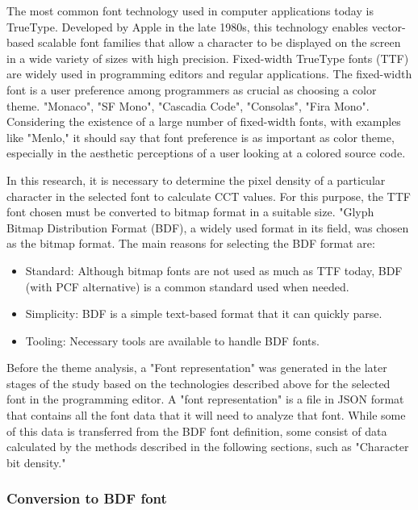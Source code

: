 \documentclass{article}
\begin{document}
The most common font technology used in computer applications today is TrueType\cite{ttf2022reference}. Developed by Apple in the late 1980s, this technology enables vector-based scalable font families that allow a character to be displayed on the screen in a wide variety of sizes with high precision. Fixed-width TrueType fonts (TTF) are widely used in programming editors and regular applications. The fixed-width font is a user preference among programmers as crucial as choosing a color theme. "Monaco", "SF Mono", "Cascadia Code", "Consolas", "Fira Mono".
Considering the existence of a large number of\cite{wikipedia2022monospace} fixed-width fonts, with examples like "Menlo," it should say that font preference is as important as color theme, especially in the aesthetic perceptions of a user looking at a colored source code\cite{so2010monospace,quora2018monospace}.

In this research, it is necessary to determine the pixel density of a particular character in the selected font to calculate CCT values. For this purpose, the TTF font chosen must be converted to bitmap format in a suitable size. "Glyph Bitmap Distribution Format (BDF), a widely used format in its field, was chosen as the bitmap format. The main reasons for selecting the BDF format are:

\begin{itemize}
  \item Standard: Although bitmap fonts are not used as much as TTF today, BDF (with PCF alternative) is a common standard used when needed.
  \item Simplicity: BDF is a simple text-based format that it can quickly parse.
  \item Tooling: Necessary tools are available to handle BDF fonts.
\end{itemize}

Before the theme analysis, a "Font representation" was generated in the later stages of the study based on the technologies described above for the selected font in the programming editor. A "font representation" is a file in JSON format that contains all the font data that it will need to analyze that font. While some of this data is transferred from the BDF font definition, some consist of data calculated by the methods described in the following sections, such as "Character bit density."

\subsubsection{Conversion to BDF font}
\end{document}
